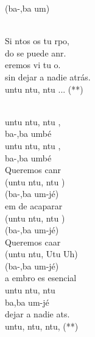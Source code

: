 \documentclass[12pt]{article}
\begin{document}
\begin{multicols*}{2}
\begin{cancion}
	(ba-,ba um)\\\jump\\
	\begin{chorus}%
	Si ntos os tu rpo,\\
	do se puede anr.\\
	eremos vi tu o. \\
sin dejar a nadie atrás.\\
	untu ntu, ntu ... (**)\\
	\end{chorus}%
	\jump\\
	untu ntu, ntu ,\\
	ba-,ba umbé\\
	untu ntu, ntu ,\\
	ba-,ba umbé\\
	Queremos canr\\
	(untu ntu, ntu )\\
	(ba-,ba um-jé)\\
	em de acaparar\\
	(untu ntu, ntu )\\
	(ba-,ba um-jé)\\
	Queremos caar\\
	(untu ntu, Utu Uh)\\
	(ba-,ba um-jé)\\
	a embro es esencial\\
	untu ntu, ntu \\
	ba,ba um-jé\\
	 dejar a nadie ats. \\
	untu, ntu, ntu,  (**)\\
\end{cancion}%


\end{multicols*}
\end{document}

